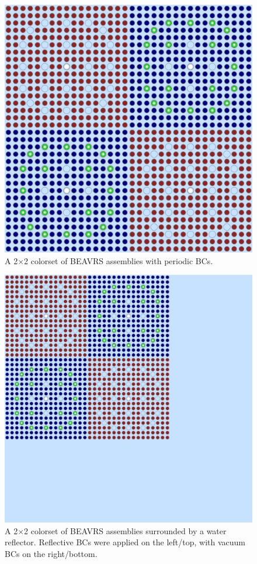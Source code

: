 \begin{figure}[h!]
  \centering
  \includegraphics[width=0.63\linewidth]{figures/benchmarks/2x2}
\vspace{2mm}
\caption[A 2$\times$2 colorset of BEAVRS assemblies]{A 2$\times$2 colorset of BEAVRS assemblies with periodic BCs.}
\label{fig:chap7-2x2}
\end{figure}

\begin{figure}[h!]
  \centering
  \includegraphics[width=0.63\linewidth]{figures/benchmarks/reflector}
\vspace{2mm}
\caption[A reflected 2$\times$2 colorset of BEAVRS assemblies]{A 2$\times$2 colorset of BEAVRS assemblies surrounded by a water reflector. Reflective \acp{BC} were applied on the left/top, with vacuum \acp{BC} on the right/bottom.}
\label{fig:chap7-reflector}
\end{figure}

